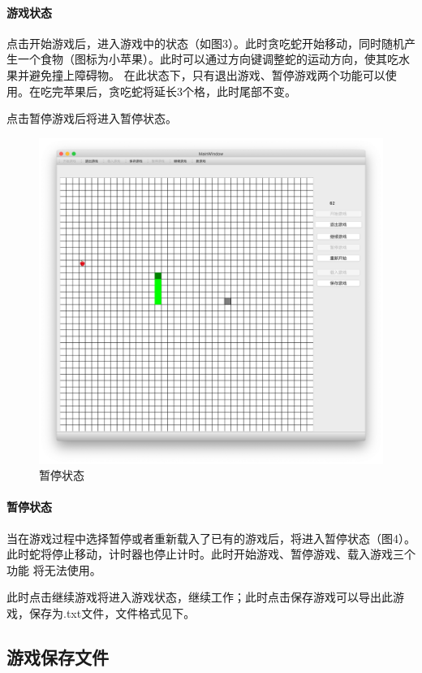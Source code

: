\documentclass[utf-8]{ctexart}
\begin{document}
    \paragraph{游戏状态} 点击开始游戏后，进入游戏中的状态（如图3）。此时贪吃蛇开始移动，同时随机产生一个食物（图标为小苹果）。此时可以通过方向键调整蛇的运动方向，使其吃水果并避免撞上障碍物。
    在此状态下，只有退出游戏、暂停游戏两个功能可以使用。在吃完苹果后，贪吃蛇将延长3个格，此时尾部不变。
    \par 点击暂停游戏后将进入暂停状态。

    \begin{figure}[h]
        \centering
        \includegraphics[scale = 0.2]{texsrc/界面paused.png}
        \caption{暂停状态}
        \label{paused}
    \end{figure}
    \paragraph{暂停状态} 当在游戏过程中选择暂停或者重新载入了已有的游戏后，将进入暂停状态（图4）。此时蛇将停止移动，计时器也停止计时。此时开始游戏、暂停游戏、载入游戏三个功能
    将无法使用。
    \par 此时点击继续游戏将进入游戏状态，继续工作；此时点击保存游戏可以导出此游戏，保存为.txt文件，文件格式见下。

    \subsection{游戏保存文件}
\end{document}
